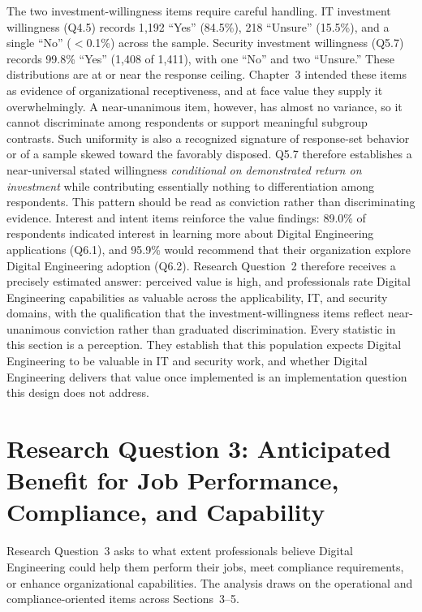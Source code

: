 The two investment-willingness items require careful handling. IT investment willingness (Q4.5) records 1{,}192 ``Yes'' (84.5\%), 218 ``Unsure'' (15.5\%), and a single ``No'' ($<$0.1\%) across the sample. Security investment willingness (Q5.7) records 99.8\% ``Yes'' (1{,}408 of 1{,}411), with one ``No'' and two ``Unsure.'' These distributions are at or near the response ceiling. Chapter~3 intended these items as evidence of organizational receptiveness, and at face value they supply it overwhelmingly. A near-unanimous item, however, has almost no variance, so it cannot discriminate among respondents or support meaningful subgroup contrasts. Such uniformity is also a recognized signature of response-set behavior or of a sample skewed toward the favorably disposed. Q5.7 therefore establishes a near-universal stated willingness \emph{conditional on demonstrated return on investment} while contributing essentially nothing to differentiation among respondents. This pattern should be read as conviction rather than discriminating evidence. Interest and intent items reinforce the value findings: 89.0\% of respondents indicated interest in learning more about Digital Engineering applications (Q6.1), and 95.9\% would recommend that their organization explore Digital Engineering adoption (Q6.2).
Research Question~2 therefore receives a precisely estimated answer: perceived value is high, and professionals rate Digital Engineering capabilities as valuable across the applicability, IT, and security domains, with the qualification that the investment-willingness items reflect near-unanimous conviction rather than graduated discrimination. Every statistic in this section is a perception. They establish that this population expects Digital Engineering to be valuable in IT and security work, and whether Digital Engineering delivers that value once implemented is an implementation question this design does not address.

\section{Research Question 3: Anticipated Benefit for Job Performance, Compliance, and Capability}

Research Question~3 asks to what extent professionals believe Digital Engineering could help them perform their jobs, meet compliance requirements, or enhance organizational capabilities. The analysis draws on the operational and compliance-oriented items across Sections~3--5.

